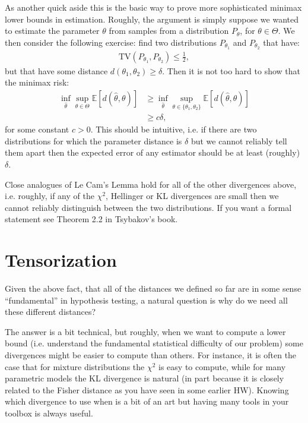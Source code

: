 \documentclass[twoside,12pt]{article}
\begin{document}
As another quick aside this is the basic way to prove more sophisticated minimax lower bounds in estimation. Roughly, the argument is simply suppose we wanted to estimate the parameter $\theta$ from samples from a distribution $P_{\theta}$, for $\theta \in \Theta$. We then consider the following exercise: find two distributions $P_{\theta_1}$ and $P_{\theta_2}$ that have:
\begin{align*}
\text{TV}(P_{\theta_1}, P_{\theta_2}) \leq \frac{1}{2},
\end{align*}
but that have some distance $d(\theta_1,\theta_2) \geq \delta$. Then it is not too hard to show that the minimax risk:
\begin{align*}
\inf_{\widehat{\theta}} \sup_{\theta \in \Theta} \mathbb{E}[d(\widehat{\theta},\theta)] &\geq \inf_{\widehat{\theta}} \sup_{\theta \in \{\theta_1,\theta_2\}} \mathbb{E} [d(\widehat{\theta},\theta)] \\
&\geq c \delta,
\end{align*}
for some constant $c > 0$. This should be intuitive, i.e. if there are two distributions for which the parameter distance is $\delta$ but we cannot reliably tell them apart then the expected error of any estimator should be at least (roughly) $\delta$. 

Close analogues of Le Cam's Lemma hold for all of the other divergences above, i.e. roughly, if any of the $\chi^2$, Hellinger or KL divergences are small then we cannot reliably distinguish between the two distributions. If you want a formal statement see Theorem 2.2 in Tsybakov's book.

\section{Tensorization}
Given the above fact, that all of the distances we defined so far are in some sense ``fundamental'' in hypothesis testing, a natural question is why do we need all these different distances?

The answer is a bit technical, but roughly, when we want to compute a lower bound (i.e. understand the fundamental statistical difficulty of our problem) some divergences might be easier to compute than others. For instance, it is often the case that for mixture distributions the $\chi^2$ is easy to compute, while for many parametric models the KL divergence is natural (in part because it is closely related to the Fisher distance as you have seen in some earlier HW). Knowing which divergence to use when is a bit of an art but having many tools in your toolbox is always useful.
\end{document}
